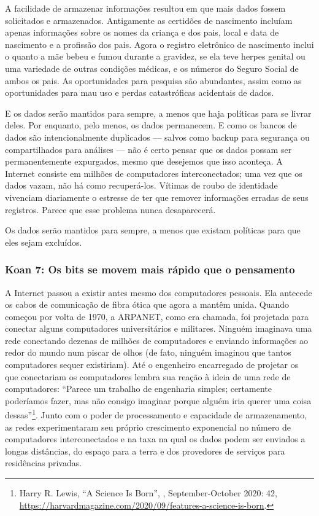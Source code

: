 A facilidade de armazenar informações resultou em que mais dados fossem
solicitados e armazenados. Antigamente as certidões de nascimento incluíam
apenas informações sobre os nomes da criança e dos pais, local e data de
nascimento e a profissão dos pais. Agora o registro eletrônico de nascimento
inclui o quanto a mãe bebeu e fumou durante a gravidez, se ela teve herpes
genital ou uma variedade de outras condições médicas, e os números do Seguro
Social de ambos os pais. As oportunidades para pesquisa são abundantes, assim
como as oportunidades para mau uso e perdas catastróficas acidentais de dados.

E os dados serão mantidos para sempre, a menos que haja políticas para se livrar
deles. Por enquanto, pelo menos, os dados permanecem. E como os bancos de dados
são intencionalmente duplicados --- salvos como backup para segurança ou
compartilhados para análises --- não é certo pensar que os dados possam ser
permanentemente expurgados, mesmo que desejemos que isso aconteça. A Internet
consiste em milhões de computadores interconectados; uma vez que os dados vazam,
não há como recuperá-los. Vítimas de roubo de identidade vivenciam diariamente o
estresse de ter que remover informações erradas de seus registros. Parece que
esse problema nunca desaparecerá.

\begin{tcolorbox}
Os dados serão mantidos para sempre, a menos que existam políticas para que eles
sejam excluídos.
\end{tcolorbox}

\subsubsection*{Koan 7: Os bits se movem mais rápido que o pensamento}
\label{cap1:exp-dig-koans:7}
A Internet passou a existir antes mesmo dos computadores pessoais. Ela antecede
os cabos de comunicação de fibra ótica que agora a mantêm unida. Quando começou
por volta de 1970, a ARPANET, como era chamada, foi projetada para conectar
alguns computadores universitários e militares. Ninguém imaginava uma rede
conectando dezenas de milhões de computadores e enviando informações ao redor do
mundo num piscar de olhos (de fato, ninguém imaginou que tantos computadores
sequer existiriam). Até o engenheiro encarregado de projetar os
 que conectariam os computadores lembra sua reação à ideia de
uma rede de computadores: ``Parece um trabalho de engenharia simples; certamente
poderíamos fazer, mas não consigo imaginar porque alguém iria querer uma coisa
dessas''\footnote{Harry R. Lewis, ``A Science Is Born'', , September-October 2020: 42,
\url{https://harvardmagazine.com/2020/09/features-a-science-is-born}.}. Junto
com o poder de processamento e capacidade de armazenamento, as redes
experimentaram seu próprio crescimento exponencial no número de computadores
interconectados e na taxa na qual os dados podem ser enviados a longas
distâncias, do espaço para a terra e dos provedores de serviços para residências
privadas.

